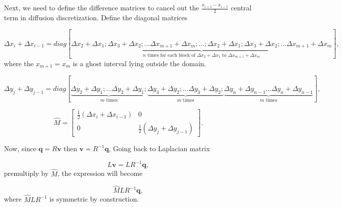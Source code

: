 \documentclass{article}
\begin{document}
Next, we need to define the difference matrices to cancel out the $\frac{x_{i+1}−x_{i-1}}{2}$ central term in diffusion discretization. Define the diagonal matrices

\begin{equation*}
{\Delta x_i+\Delta x_{i-1}} = diag[\underbrace{\Delta x_2+\Delta x_1; \Delta x_3+\Delta x_2; \dotsc \Delta x_{m+1}+\Delta x_{m}; ...;\Delta x_2+\Delta x_1; \Delta x_3+\Delta x_2; \dotsc \Delta x_{m+1}+\Delta x_{m}}_{n\text{ times for each block of } \Delta x_2+\Delta x_1\text{ to }\Delta x_{m+1}+\Delta x_{m}}],
\end{equation*}
where the $x_{m+1}=x_m$ is a ghost interval lying outside the domain. 


\begin{equation*}
{\Delta y_j+\Delta y_{j-1}} = diag[\underbrace{\Delta y_2+\Delta y_1;  \dotsc \Delta y_2+\Delta y_1;}_{m\text{ times}} \underbrace{\Delta y_3+\Delta y_2; \dotsc \Delta y_3+\Delta y_2;}_{m\text{ times}} \underbrace{\Delta y_n+\Delta y_{n-1}\dotsc \Delta y_n+\Delta y_{n-1}}_{m\text{ times}}],	
\end{equation*}


\begin{equation*}
\hat{M} =\left[\begin{array}{cc}
\frac{1}{2}\left(\Delta x_i+\Delta x_{i-1}\right) & 0 \\
0 & \frac{1}{2}\left(\Delta y_j+\Delta y_{j-1}\right)
\end{array}\right].
\end{equation*}

Now, since $\boldsymbol{q}=R\boldsymbol{v}$ then $\boldsymbol{v}=R^{-1}\boldsymbol{q}$, Going back to Laplacian matrix

$$L\boldsymbol{v}= LR^{-1}\boldsymbol{q},$$ 
premultiply by $\hat M$, the expression will become 

$$\hat MLR^{-1}\boldsymbol{q},$$ 
where $\hat M L R^{-1}$ is symmetric by construction.  
\end{document}
